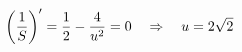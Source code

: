 \documentclass[preview]{standalone}
\begin{document}
\begin{align*}
\special{dvisvgm:raw <g id='unique000'>}\left(\frac{1}{S}\right)'=\frac{1}{2}-\frac{4}{u^2}=0\quad\Rightarrow\quad u=2\sqrt2\special{dvisvgm:raw </g>}
\end{align*}
\end{document}
